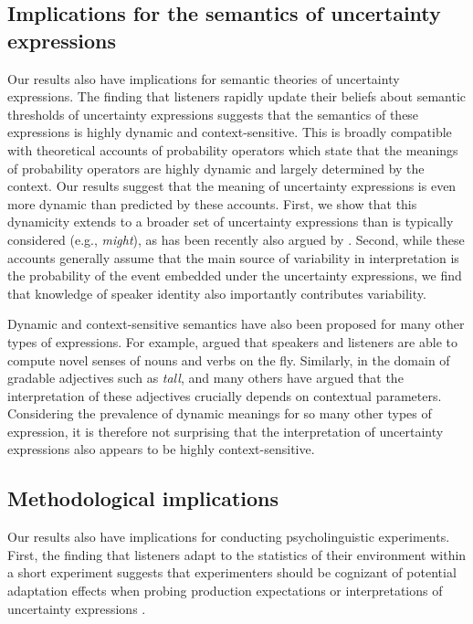 \documentclass[man, floatsintext]{apa6}
\begin{document}


\subsection{Implications for the semantics of uncertainty expressions}

Our results also have implications for semantic theories of uncertainty expressions.
The finding that listeners rapidly update their beliefs about semantic thresholds of uncertainty expressions
suggests that the semantics of these expressions is highly dynamic and context-sensitive. This is broadly compatible with 
theoretical accounts of probability operators \parencite[a subset of uncertainty expressions; e.g.,][]{Yalcin2010} which 
state that the meanings of probability operators are highly dynamic and largely determined by the context. Our results
suggest that the meaning of uncertainty expressions is even more dynamic than predicted by these accounts. First, we show that this dynamicity 
extends to a broader set of uncertainty expressions than is typically considered (e.g., \textit{might}), as has been recently also argued by \textcite{Lassiter2016}. 
Second, while these accounts generally assume 
that the main source of variability in interpretation is the probability of the event
embedded under the uncertainty expressions, we find that knowledge of speaker identity also  importantly contributes variability.

Dynamic and context-sensitive semantics have also been proposed for many other types of expressions.
For example, \textcite{Clark1983} argued that speakers and listeners
are able to compute novel senses of nouns and verbs on the fly. Similarly, in the domain of gradable adjectives such as \textit{tall},
 \textcite{Kennedy2007} and many others have argued that the interpretation of these adjectives crucially depends on contextual
 parameters. Considering the prevalence of dynamic meanings for so many other types of expression, it is therefore not 
 surprising that the interpretation of uncertainty expressions also appears to be highly context-sensitive.
 
\subsection{Methodological implications}

Our results also have implications for conducting psycholinguistic experiments. First,
the finding that listeners adapt to the statistics of their environment within a short experiment
suggests that experimenters should be cognizant of potential adaptation effects when probing
production expectations or interpretations of uncertainty expressions \parencite[see also][]{Jaeger2010}. 
\end{document}
